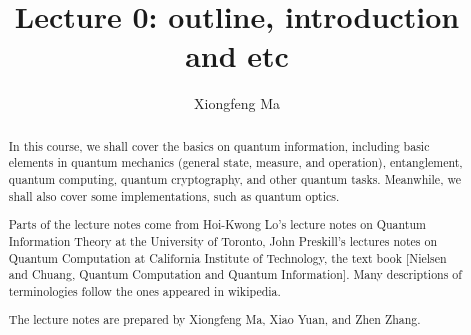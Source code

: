 \documentclass[onecolumn,pra,superscriptaddress]{revtex4-1}
\begin{document}
\title{Lecture 0: outline, introduction and etc}



\author{Xiongfeng Ma}


\begin{abstract}
In this course, we shall cover the basics on quantum information, including basic elements in quantum mechanics (general state, measure, and operation), entanglement, quantum computing, quantum cryptography, and other quantum tasks. Meanwhile, we shall also cover some implementations, such as quantum optics.

Parts of the lecture notes come from Hoi-Kwong Lo's lecture notes on Quantum Information Theory at the University of Toronto, John Preskill's lectures notes on Quantum Computation at California Institute of Technology, the text book [Nielsen and Chuang, Quantum Computation and Quantum Information]. Many descriptions of terminologies follow the ones appeared in wikipedia.

The lecture notes are prepared by Xiongfeng Ma, Xiao Yuan, and Zhen Zhang.
\end{abstract}



\maketitle %

\end{document}
